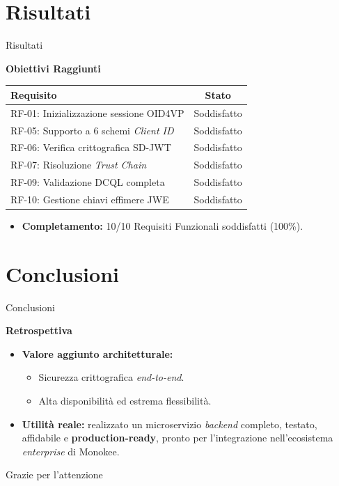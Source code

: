 \documentclass{beamer}
\begin{document}
	\section{Risultati}
	\begin{frame}{Risultati}
		\vfill
		{\centering \huge{\textbf{\textcolor{rossoPantano}{Obiettivi Raggiunti}}} \par}
		\vspace{0.5em}
		\begin{table}[]
		\centering
		\begin{tabular}{|l|c|}
		\hline
		\textbf{Requisito} & \textbf{Stato} \\ \hline
		RF-01: Inizializzazione sessione OID4VP & Soddisfatto \\ \hline
		RF-05: Supporto a 6 schemi \textit{Client ID} & Soddisfatto \\ \hline
		RF-06: Verifica crittografica SD-JWT & Soddisfatto \\ \hline
		RF-07: Risoluzione \textit{Trust Chain} & Soddisfatto \\ \hline
		RF-09: Validazione DCQL completa & Soddisfatto \\ \hline
		RF-10: Gestione chiavi effimere JWE & Soddisfatto \\ \hline
		\end{tabular}
		\end{table}
		\vspace{1em}
		\begin{itemize}
			\item \textbf{Completamento:} 10/10 Requisiti Funzionali soddisfatti (100\%).
		\end{itemize}
		\vfill
	\end{frame}


	\section{Conclusioni}

	\begin{frame}{Conclusioni}
		\vfill
		{\centering \huge{\textbf{\textcolor{rossoPantano}{Retrospettiva}}} \par}
		\vspace{0.5em}
		\begin{itemize}
			\item \textbf{Valore aggiunto architetturale:}
			\begin{itemize}
				\item Sicurezza crittografica \textit{end-to-end}.
				\item Alta disponibilità ed estrema flessibilità.
			\end{itemize}
			\vspace{1em}
			\item \textbf{Utilità reale:} realizzato un microservizio \textit{backend} completo, testato, affidabile e \textbf{production-ready}, pronto per l'integrazione nell'ecosistema \textit{enterprise} di Monokee.
		\end{itemize}
		\vfill
	\end{frame}

	\begin{frame}
		\centering
		\Huge{Grazie per l'attenzione}
	\end{frame}
\end{document}
